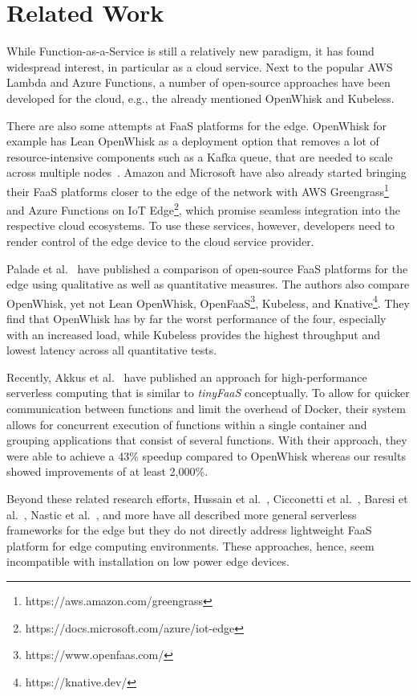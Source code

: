 \chapter{Related Work}
\label{cha:relatedwork}

While Function-as-a-Service is still a relatively new paradigm, it has found widespread interest, in particular as a cloud service.
Next to the popular AWS Lambda and Azure Functions, a number of open-source approaches have been developed for the cloud, e.g., the already mentioned OpenWhisk and Kubeless.

There are also some attempts at FaaS platforms for the edge.
OpenWhisk for example has Lean OpenWhisk as a deployment option that removes a lot of resource-intensive components such as a Kafka queue, that are needed to scale across multiple nodes~\cite{Breitgand2018-fs}.
Amazon and Microsoft have also already started bringing their FaaS platforms closer to the edge of the network with AWS Greengrass\footnote{https://aws.amazon.com/greengrass} and Azure Functions on IoT Edge\footnote{https://docs.microsoft.com/azure/iot-edge}, which promise seamless integration into the respective cloud ecosystems.
To use these services, however, developers need to render control of the edge device to the cloud service provider.

Palade et al.~\cite{Palade2019-mo} have published a comparison of open-source FaaS platforms for the edge using qualitative as well as quantitative measures.
The authors also compare OpenWhisk, yet not Lean OpenWhisk, OpenFaaS\footnote{https://www.openfaas.com/}, Kubeless, and Knative\footnote{https://knative.dev/}.
They find that OpenWhisk has by far the worst performance of the four, especially with an increased load, while Kubeless provides the highest throughput and lowest latency across all quantitative tests.

Recently, Akkus et al.~\cite{Akkus2018-gj} have published an approach for high-performance serverless computing that is similar to \textit{tinyFaaS} conceptually.
To allow for quicker communication between functions and limit the overhead of Docker, their system allows for concurrent execution of functions within a single container and grouping applications that consist of several functions.
With their approach, they were able to achieve a 43\% speedup compared to OpenWhisk whereas our results showed improvements of at least 2,000\%.

Beyond these related research efforts, Hussain et al.~\cite{Hussain2019-mj}, Cicconetti et al.~\cite{Cicconetti2018-hw}, Baresi et al.~\cite{Baresi2017-jg}, Nastic et al.~\cite{Nastic2018-ec}, and more have all described more general serverless frameworks for the edge but they do not directly address lightweight FaaS platform for edge computing environments.
These approaches, hence, seem incompatible with installation on low power edge devices.

